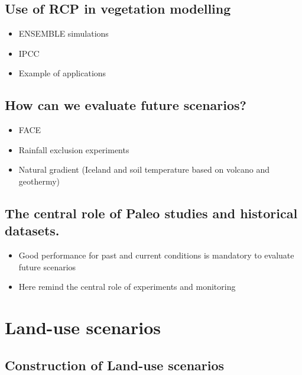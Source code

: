 \documentclass[12pt,oneside]{book}
\providecommand{\tightlist}{%
  \setlength{\itemsep}{0pt}\setlength{\parskip}{0pt}}
\begin{document}
\subsection{Use of RCP in vegetation
modelling}\label{use-of-rcp-in-vegetation-modelling}

\begin{itemize}
\tightlist
\item
  ENSEMBLE simulations
\item
  IPCC
\item
  Example of applications
\end{itemize}

\subsection{How can we evaluate future
scenarios?}\label{how-can-we-evaluate-future-scenarios}

\begin{itemize}
\tightlist
\item
  FACE
\item
  Rainfall exclusion experiments
\item
  Natural gradient (Iceland and soil temperature based on volcano and
  geothermy)
\end{itemize}

\subsection{The central role of Paleo studies and historical
datasets.}\label{the-central-role-of-paleo-studies-and-historical-datasets.}

\begin{itemize}
\tightlist
\item
  Good performance for past and current conditions is mandatory to
  evaluate future scenarios
\item
  Here remind the central role of experiments and monitoring
\end{itemize}

\section{Land-use scenarios}\label{land-use-scenarios}

\subsection{Construction of Land-use
scenarios}\label{construction-of-land-use-scenarios}
\end{document}
